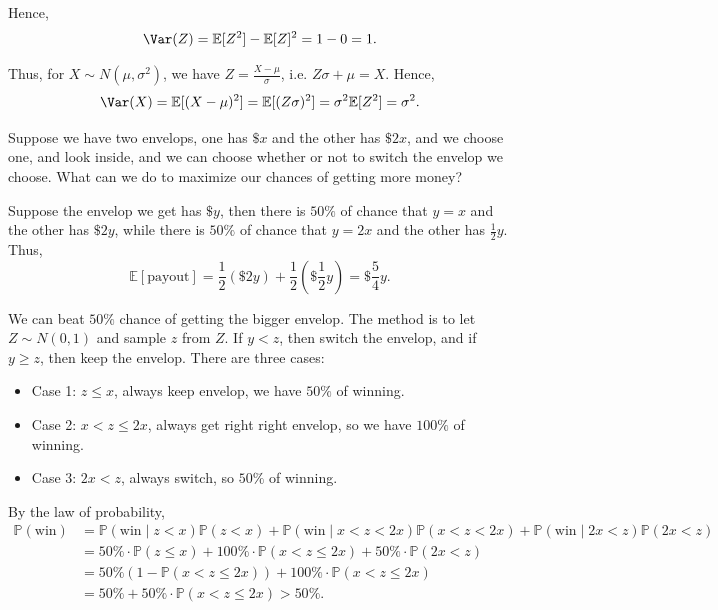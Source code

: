 Hence,
\[
    \Var(Z) = \mathbb{E} [Z^2] - \mathbb{E} [Z]^2 = 1 - 0 = 1.
\]

Thus, for \(X \sim N(\mu , \sigma ^2)\), we have \(Z = \frac{X - \mu}{\sigma }\), i.e. \(Z \sigma + \mu = X\). Hence,
\[
    \Var(X) = \mathbb{E} [(X - \mu)^2] = \mathbb{E} [(Z \sigma )^2] = \sigma ^2 \mathbb{E} [Z^2] = \sigma ^2.
\]   

\begin{eg}
    Suppose we have two envelops, one has \(\$ x\) and the other has \(\$ 2x\), and we choose one, and look inside, and we can choose whether or not to switch the envelop we choose. What can we do to maximize our chances of getting more money?  
\end{eg}

\begin{explanation}
    Suppose the envelop we get has \(\$ y\), then there is \(50 \%\) of chance that \(y = x\) and the other has \(\$ 2y\), while there is \(50 \%\) of chance that \(y = 2x\) and the other has \(\frac{1}{2} y\). Thus,
    \[
        \mathbb{E} [\text{payout} ] = \frac{1}{2} (\$2y) + \frac{1}{2} (\$ \frac{1}{2} y) = \$ \frac{5}{4} y.
    \]       

    We can beat \(50 \%\) chance of getting the bigger envelop. The method is to let \(Z \sim N(0, 1)\) and sample \(z\) from \(Z\). If \(y < z\), then switch the envelop, and if \(y \ge z\), then keep the envelop. There are three cases:
    \begin{itemize}
        \item Case 1: \(z \le x\), always keep envelop, we have \(50 \%\) of winning. 
        \item Case 2: \(x < z \le 2x\), always get right right envelop, so we have \(100 \%\) of winning.  
        \item Case 3: \(2x < z\), always switch, so \(50\%\) of winning.    
    \end{itemize}  
    By the law of probability,
    \begin{align*}
        \mathbb{P} (\text{win} ) &= \mathbb{P} (\text{win} \mid z < x ) \mathbb{P} (z < x) + \mathbb{P} (\text{win} \mid x < z < 2x ) \mathbb{P} (x < z < 2x) + \mathbb{P} (\text{win} \mid 2x < z ) \mathbb{P} (2x < z) \\
        &= 50 \% \cdot \mathbb{P} (z \le x) + 100 \% \cdot \mathbb{P} (x < z \le 2x) + 50 \% \cdot \mathbb{P} (2x < z) \\
        &= 50 \% (1 - \mathbb{P} (x < z \le 2x)) + 100 \% \cdot \mathbb{P} (x < z \le 2x) \\
        &= 50\% + 50 \% \cdot \mathbb{P} (x < z \le 2x) > 50 \%.
    \end{align*}
\end{explanation}

